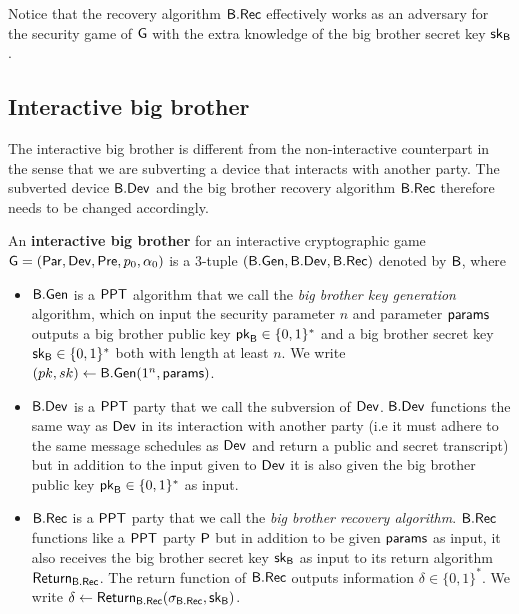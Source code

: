 Notice that the recovery algorithm $\mathsf{B}.\mathsf{Rec}$ effectively works as an adversary for the security game of $\operatorname{\mathsf{G}}$ with the extra knowledge of the big brother secret key $\mathsf{sk}_{\mathsf{B}}$. 

\subsection{Interactive big brother}

The interactive big brother is different from the non-interactive counterpart in the sense that we are subverting a device that interacts with another party. The subverted device $\mathsf{B}.\mathsf{Dev}$ and the big brother recovery algorithm $\mathsf{B}.\mathsf{Rec}$ therefore needs to be changed accordingly. 

\begin{defn}
	An \textbf{interactive big brother} for an interactive cryptographic game $\operatorname{\mathsf{G}}=\left(\operatorname{\mathsf{Par}},\operatorname{\mathsf{Dev}},\operatorname{\mathsf{Pre}},p_{0},\alpha_{0}\right)$ is a 3-tuple $(\mathsf{B}.\mathsf{Gen},\mathsf{B}.\mathsf{Dev}, \mathsf{B}.\mathsf{Rec})$ denoted by $\mathsf{B}$, where
	\begin{itemize}
	\itemsep-0.1em
		\item $\mathsf{B}.\mathsf{Gen}$ is a $\mathsf{PPT}$ algorithm that we call the \emph{big brother key generation} algorithm, which on input the security parameter $n$  and parameter $\mathsf{params}$ outputs a big brother public key $\mathsf{pk}_{\mathsf{B}}\in\{0,1\}^*$ and a big brother secret key $\mathsf{sk}_{\mathsf{B}}\in\{0,1\}^*$ both with length at least $n$. We write $(pk,sk)\leftarrow \mathsf{B}.\mathsf{Gen}(1^n, \mathsf{params})$. 
		\item $\mathsf{B}.\mathsf{Dev}$ is a $\mathsf{PPT}$ party that we call the subversion of $\operatorname{\mathsf{Dev}}$. $\mathsf{B}.\mathsf{Dev}$ functions the same way as $\operatorname{\mathsf{Dev}}$ in its interaction with another party (i.e it must adhere to the same message schedules as $\operatorname{\mathsf{Dev}}$ and return a public and secret transcript) but in addition to the input given to $\operatorname{\mathsf{Dev}}$ it is also given the big brother public key $\mathsf{pk}_{\mathsf{B}}\in\{0,1\}^*$ as input. 
		\item $\mathsf{B}.\mathsf{Rec}$ is a $\mathsf{PPT}$ party that we call the \textit{big brother recovery algorithm}. $\mathsf{B}.\mathsf{Rec}$ functions like a $\mathsf{PPT}$ party $\mathsf{P}$ but in addition to be given $\mathsf{params}$ as input, it also receives the big brother secret key $\mathsf{sk}_{\mathsf{B}}$ as input to its return algorithm $\operatorname{\mathsf{Return}}_{\mathsf{B}.\mathsf{Rec}}$. The return function of $\mathsf{B}.\mathsf{Rec}$ outputs information $\delta\in\{0,1\}^*$. We write $\delta\leftarrow\operatorname{\mathsf{Return}}_{\mathsf{B}.\mathsf{Rec}}(\sigma_{\mathsf{B}.\mathsf{Rec}},\mathsf{sk}_{\mathsf{B}})$.
	\end{itemize} 
\end{defn}

